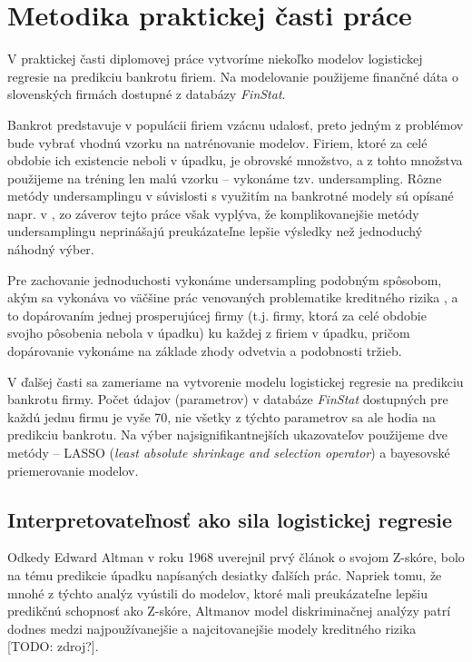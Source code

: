 \section{Metodika praktickej časti práce}
\label{metodika}

V praktickej časti diplomovej práce vytvoríme niekoľko modelov logistickej regresie na predikciu bankrotu firiem.
Na modelovanie použijeme finančné dáta o slovenských firmách dostupné z databázy \emph{FinStat}.

Bankrot predstavuje v populácii firiem vzácnu udalosť, preto jedným z problémov bude vybrať vhodnú vzorku na natrénovanie modelov.
Firiem, ktoré za celé obdobie ich existencie neboli v úpadku, je obrovské množstvo, a z tohto množstva použijeme na tréning len malú vzorku – vykonáme tzv. undersampling.
Rôzne metódy undersamplingu v súvislosti s využitím na bankrotné modely sú opísané napr. v \cite{protopapadakis},
zo záverov tejto práce však vyplýva, že komplikovanejšie metódy undersamplingu neprinášajú preukázateľne lepšie výsledky než jednoduchý náhodný výber.

Pre zachovanie jednoduchosti vykonáme undersampling podobným spôsobom, akým sa vykonáva vo väčšine prác venovaných problematike kreditného rizika \cite{zmijewski},
a to dopárovaním jednej prosperujúcej firmy (t.j. firmy, ktorá za celé obdobie svojho pôsobenia nebola v úpadku) ku každej z firiem v úpadku,
pričom dopárovanie vykonáme na základe zhody odvetvia a podobnosti tržieb.

V ďalšej časti sa zameriame na vytvorenie modelu logistickej regresie na predikciu bankrotu firmy.
Počet údajov (parametrov) v databáze \emph{FinStat} dostupných pre každú jednu firmu je vyše 70, nie všetky z týchto parametrov sa ale hodia na predikciu bankrotu.
Na výber najsignifikantnejších ukazovateľov použijeme dve metódy – LASSO (\emph{least absolute shrinkage and selection operator}) a bayesovské priemerovanie modelov.

\subsection{Interpretovateľnosť ako sila logistickej regresie}

Odkedy Edward Altman v roku 1968 uverejnil prvý článok o svojom Z-skóre, bolo na tému predikcie úpadku napísaných desiatky ďalších prác.
Napriek tomu, že mnohé z týchto analýz vyústili do modelov, ktoré mali preukázateľne lepšiu predikčnú schopnosť ako Z-skóre,
Altmanov model diskriminačnej analýzy patrí dodnes medzi najpoužívanejšie a najcitovanejšie modely kreditného rizika [TODO: zdroj?].

